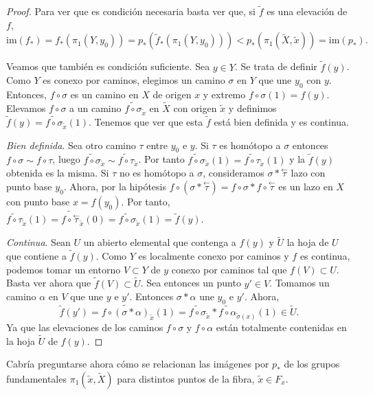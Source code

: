 \documentclass[12pt,a4paper]{book}
\theoremstyle{definition} \newtheorem{defn}[thm]{Definición}
\theoremstyle{definition} \newtheorem{ejemplo}[thm]{Ejemplo}
\theoremstyle{definition} \newtheorem{ejercicio}[thm]{Ejercicio}
\theoremstyle{remark} \newtheorem*{obs}{Observación}
\def\gf{\pi_1}
\def\XX{\tilde{X}}
\def\xx{\tilde{x}}
\def\im{\mathrm{im}}
\newcommand\cev[1]{\overset{\leftarrow}{#1}}
\begin{document}
\begin{proof}
  Para ver que es condición necesaria basta ver que, si $\tilde{f}$ es una elevación de $f$,
  \begin{equation*}
    \im(f_*)=f_*(\gf(Y,y_0))=p_*(\tilde{f}_*(\gf(Y,y_0)))<p_*(\gf(\XX,\xx))=\im(p_*).
  \end{equation*}

  Veamos que también es condición suficiente. Sea $y\in Y$. Se trata de definir $\tilde{f}(y)$. Como $Y$ es conexo por caminos, elegimos un camino $\sigma$ en $Y$ que une $y_0$ con $y$. Entonces, $f\circ \sigma$ es un camino en $X$ de origen $x$ y extremo $f\circ \sigma (1)=f(y)$. Elevamos $f\circ \sigma$ a un camino $\widetilde{f\circ\sigma}_{\xx}$ en $\XX$ con origen $\xx$ y definimos $\tilde{f}(y)=\widetilde{f\circ\sigma}_{\xx}(1)$. Tenemos que ver que esta $\tilde{f}$ está bien definida y es continua.

  \textit{Bien definida}. Sea otro camino $\tau$ entre $y_0$ e $y$. Si $\tau$ es homótopo a $\sigma$ entonces $f\circ \sigma\sim f\circ \tau$, luego $\widetilde{f\circ\sigma}_{\xx}\sim\widetilde{f\circ\tau}_{\xx}$. Por tanto $\widetilde{f\circ\sigma}_{\xx}(1)=\widetilde{f\circ\tau}_{\xx}(1)$ y la $\tilde{f}(y)$ obtenida es la misma. Si $\tau$ no es homótopo a $\sigma$, consideramos $\sigma*\cev{\tau}$ lazo con punto base $y_0$. Ahora, por la hipótesis $f\circ(\sigma*\cev{\tau})=f\circ\sigma * f\circ \cev{\tau}$ es un lazo en $X$ con punto base $x=f(y_0)$. Por tanto, $\widetilde{f\circ\tau}_{\xx}(1)=\widetilde{f\circ\cev{\tau}}_{\xx}(0)=\widetilde{f\circ\sigma}_{\xx}(1)=\tilde{f}(y)$.

  \textit{Continua}. Sean $U$ un abierto elemental que contenga a $f(y)$ y $\tilde{U}$ la hoja de $U$ que contiene a $\tilde{f}(y)$. Como $Y$ es localmente conexo por caminos y $f$ es continua, podemos tomar un entorno $V\subset Y$ de $y$ conexo por caminos tal que $f(V)\subset U$. Basta ver ahora que $\tilde{f}(V)\subset \tilde{U}$. Sea entonces un punto $y'\in V$. Tomamos un camino $\alpha$ en $V$ que une $y$ e $y'$. Entonces $\sigma * \alpha$ une $y_0$ e $y'$. Ahora, $$\tilde{f}(y')=\widetilde{f\circ(\sigma*\alpha)}_{\xx}(1)=\widetilde{f\circ\sigma}_{\xx}*\widetilde{f\circ\alpha}_{\tilde{\sigma}(x)}(1)\in \tilde{U}.$$ Ya que las elevaciones de los caminos $f\circ \sigma$ y $f\circ \alpha$ están totalmente contenidas en la hoja $\tilde{U}$ de $f(y)$.
\end{proof}

Cabría preguntarse ahora cómo se relacionan las imágenes por $p_*$ de los grupos fundamentales $\gf(\xx,\XX)$ para distintos puntos de la fibra, $\xx\in F_x$.
\end{document}
